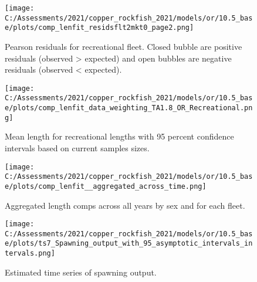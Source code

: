 \documentclass[11pt,
  english,
  a4paper,
]{article}
\begin{document}
\tagmcend\tagstructend


\begin{figure}
\centering
\texttt{[image: C:/Assessments/2021/copper\_rockfish\_2021/models/or/10.5\_base/plots/comp\_lenfit\_residsflt2mkt0\_page2.png]}
\caption{Pearson residuals for recreational fleet. Closed bubble are positive residuals (observed \textgreater{} expected) and open bubbles are negative residuals (observed \textless{} expected).\label{fig:rec-pearson}}
\end{figure}

\tagmcend\tagstructend


\begin{figure}
\centering
\texttt{[image: C:/Assessments/2021/copper\_rockfish\_2021/models/or/10.5\_base/plots/comp\_lenfit\_data\_weighting\_TA1.8\_OR\_Recreational.png]}
\caption{Mean length for recreational lengths with 95 percent confidence intervals based on current samples sizes.\label{fig:rec-mean-len-fit}}
\end{figure}

\tagmcend\tagstructend


\begin{figure}
\centering
\texttt{[image: C:/Assessments/2021/copper\_rockfish\_2021/models/or/10.5\_base/plots/comp\_lenfit\_\_aggregated\_across\_time.png]}
\caption{Aggregated length comps across all years by sex and for each fleet.\label{fig:agg-len-fit}}
\end{figure}

\tagmcend\tagstructend


\begin{figure}
\centering
\texttt{[image: C:/Assessments/2021/copper\_rockfish\_2021/models/or/10.5\_base/plots/ts7\_Spawning\_output\_with\_95\_asymptotic\_intervals\_intervals.png]}
\caption{Estimated time series of spawning output.\label{fig:ssb}}
\end{figure}
\end{document}

